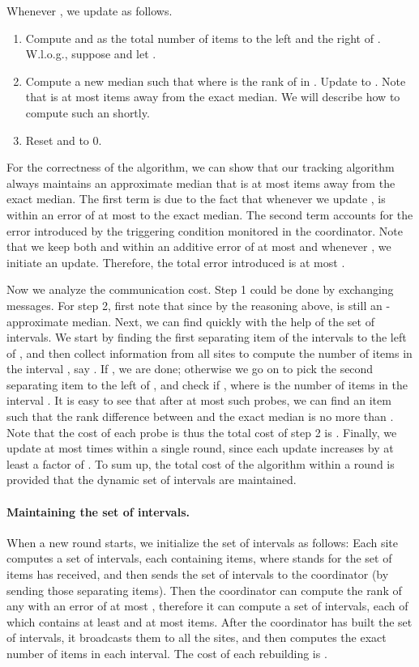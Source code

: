 \documentclass[10pt]{article}
\begin{document}
Whenever , we
update  as follows.

\begin{enumerate}
\item  Compute  and  as the total number of items to the left and
  the right of .  W.l.o.g., suppose  and let .

\item Compute a new median  such that  where  is the rank of  in .  Update  to
  .  Note that  is at most  items away from the
  exact median.  We will describe how to compute such an  shortly.

\item Reset  and  to 0.
\end{enumerate}

For the correctness of the algorithm, we can show that our
tracking algorithm always maintains an approximate median that is
at most  items away
from the exact median.  The first term  is due to
the fact that whenever we update ,  is within an error of
at most  to the exact median.  The second term
 accounts for the error introduced by the
triggering condition  monitored in
the coordinator. Note that we keep both  and
 within an additive error of at most  and whenever , we initiate an update.  Therefore, the total error
introduced is at most .

Now we analyze the communication cost. Step 1 could be done by
exchanging  messages. For step 2, first note that  since by the reasoning above,  is still an
-approximate median.  Next, we can find  quickly with
the help of the set of intervals. We start by finding the first
separating item  of the intervals to the left of , and
then collect information from all sites to compute the number of
items in the interval , say .  If , we are done; otherwise we go on to pick the
second separating item  to the left of , and check if
, where  is the number of items
in the interval . It is easy to see that after at most
 such probes, we can find an item  such that the rank
difference between  and the exact median is no more than
. Note that the cost of each probe is  thus the
total cost of step 2 is . Finally, we update  at most  times within
a single round, since each update increases  by at least a
factor of . To sum up, the total cost of
the algorithm within a round is  provided that the
dynamic set of intervals are maintained.

\paragraph{Maintaining the set of intervals.}
When a new round starts, we initialize
the set of intervals as follows: Each site 
computes a set of intervals, each containing  items,
where  stands for the set of items  has received, and then sends
the set of intervals to the coordinator (by sending those separating
items).  Then the coordinator can compute the rank of any  with an
error of at most ,
therefore it can compute a set of intervals, each of which contains at
least  and at most  items. After the
coordinator has built the set of intervals, it broadcasts them to all the
 sites, and then computes the exact number of items in each interval.
  The cost of each rebuilding is .
\end{document}
